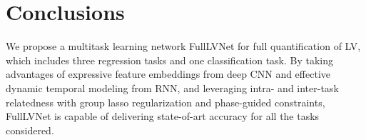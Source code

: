 \documentclass{llncs}
\begin{document}
\section{Conclusions}
We propose a multitask learning network FullLVNet for full quantification of LV, which includes three regression tasks and one classification task. By taking advantages of expressive feature embeddings from deep CNN and effective dynamic temporal modeling from RNN, and leveraging intra- and inter-task relatedness with group lasso regularization and phase-guided constraints, FullLVNet is capable of delivering state-of-art accuracy for all the tasks considered.  




\end{document}
